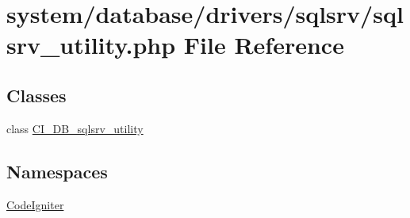 \hypertarget{sqlsrv__utility_8php}{}\section{system/database/drivers/sqlsrv/sqlsrv\+\_\+utility.php File Reference}
\label{sqlsrv__utility_8php}
\subsection*{Classes}
\begin{DoxyCompactItemize}
\item 
class \mbox{\hyperlink{class_c_i___d_b__sqlsrv__utility}{C\+I\+\_\+\+D\+B\+\_\+sqlsrv\+\_\+utility}}
\end{DoxyCompactItemize}
\subsection*{Namespaces}
\begin{DoxyCompactItemize}
\item 
 \mbox{\hyperlink{namespace_code_igniter}{Code\+Igniter}}
\end{DoxyCompactItemize}
